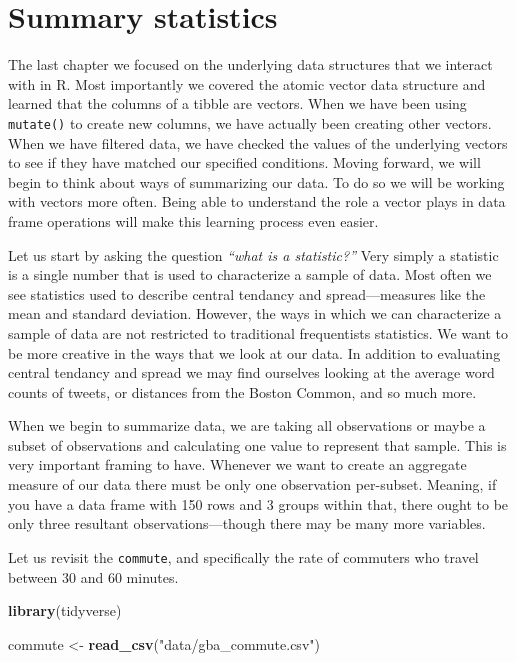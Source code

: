 \documentclass[
]{book}
\newenvironment{Shaded}{\begin{snugshade}}{\end{snugshade}}
\newcommand{\KeywordTok}[1]{\textcolor[rgb]{0.13,0.29,0.53}{\textbf{#1}}}
\newcommand{\NormalTok}[1]{#1}
\newcommand{\StringTok}[1]{\textcolor[rgb]{0.31,0.60,0.02}{#1}}
\begin{document}
\hypertarget{summary-statistics}{%
\chapter{Summary statistics}\label{summary-statistics}}

The last chapter we focused on the underlying data structures that we interact with in R. Most importantly we covered the atomic vector data structure and learned that the columns of a tibble are vectors. When we have been using \texttt{mutate()} to create new columns, we have actually been creating other vectors. When we have filtered data, we have checked the values of the underlying vectors to see if they have matched our specified conditions. Moving forward, we will begin to think about ways of summarizing our data. To do so we will be working with vectors more often. Being able to understand the role a vector plays in data frame operations will make this learning process even easier.

Let us start by asking the question \emph{``what is a statistic?''} Very simply a statistic is a single number that is used to characterize a sample of data. Most often we see statistics used to describe central tendancy and spread---measures like the mean and standard deviation. However, the ways in which we can characterize a sample of data are not restricted to traditional frequentists statistics. We want to be more creative in the ways that we look at our data. In addition to evaluating central tendancy and spread we may find ourselves looking at the average word counts of tweets, or distances from the Boston Common, and so much more.

When we begin to summarize data, we are taking all observations or maybe a subset of observations and calculating one value to represent that sample. This is very important framing to have. Whenever we want to create an aggregate measure of our data there must be only one observation per-subset. Meaning, if you have a data frame with 150 rows and 3 groups within that, there ought to be only three resultant observations---though there may be many more variables.

Let us revisit the \texttt{commute}, and specifically the rate of commuters who travel between 30 and 60 minutes.

\begin{Shaded}
\begin{Highlighting}[]
\KeywordTok{library}\NormalTok{(tidyverse)}

\NormalTok{commute \textless{}{-}}\StringTok{ }\KeywordTok{read\_csv}\NormalTok{(}\StringTok{"data/gba\_commute.csv"}\NormalTok{)}
\end{Highlighting}
\end{Shaded}
\end{document}
